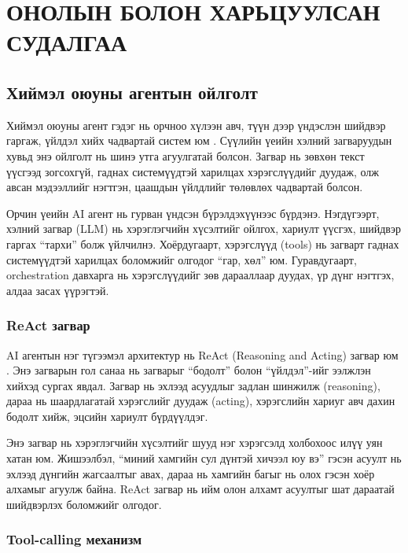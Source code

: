 \chapter{ОНОЛЫН БОЛОН ХАРЬЦУУЛСАН СУДАЛГАА}

\section{Хиймэл оюуны агентын ойлголт}

Хиймэл оюуны агент гэдэг нь орчноо хүлээн авч, түүн дээр үндэслэн шийдвэр гаргаж, үйлдэл хийх чадвартай систем юм \citep{russell-norvig}. Сүүлийн үеийн хэлний загваруудын хувьд энэ ойлголт нь шинэ утга агуулгатай болсон. Загвар нь зөвхөн текст үүсгээд зогсохгүй, гаднах системүүдтэй харилцах хэрэгслүүдийг дуудаж, олж авсан мэдээллийг нэгтгэн, цаашдын үйлдлийг төлөвлөх чадвартай болсон.

Орчин үеийн AI агент нь гурван үндсэн бүрэлдэхүүнээс бүрдэнэ. Нэгдүгээрт, хэлний загвар (LLM) нь хэрэглэгчийн хүсэлтийг ойлгох, хариулт үүсгэх, шийдвэр гаргах ``тархи'' болж үйлчилнэ. Хоёрдугаарт, хэрэгслүүд (tools) нь загварт гаднах системүүдтэй харилцах боломжийг олгодог ``гар, хөл'' юм. Гуравдугаарт, orchestration давхарга нь хэрэгслүүдийг зөв дарааллаар дуудах, үр дүнг нэгтгэх, алдаа засах үүрэгтэй.

\subsection{ReAct загвар}

AI агентын нэг түгээмэл архитектур нь ReAct (Reasoning and Acting) загвар юм \citep{react-paper}. Энэ загварын гол санаа нь загварыг ``бодолт'' болон ``үйлдэл''-ийг ээлжлэн хийхэд сургах явдал. Загвар нь эхлээд асуудлыг задлан шинжилж (reasoning), дараа нь шаардлагатай хэрэгслийг дуудаж (acting), хэрэгслийн хариуг авч дахин бодолт хийж, эцсийн хариулт бүрдүүлдэг.

Энэ загвар нь хэрэглэгчийн хүсэлтийг шууд нэг хэрэгсэлд холбохоос илүү уян хатан юм. Жишээлбэл, ``миний хамгийн сул дүнтэй хичээл юу вэ'' гэсэн асуулт нь эхлээд дүнгийн жагсаалтыг авах, дараа нь хамгийн багыг нь олох гэсэн хоёр алхамыг агуулж байна. ReAct загвар нь ийм олон алхамт асуултыг шат дараатай шийдвэрлэх боломжийг олгодог.

\subsection{Tool-calling механизм}

